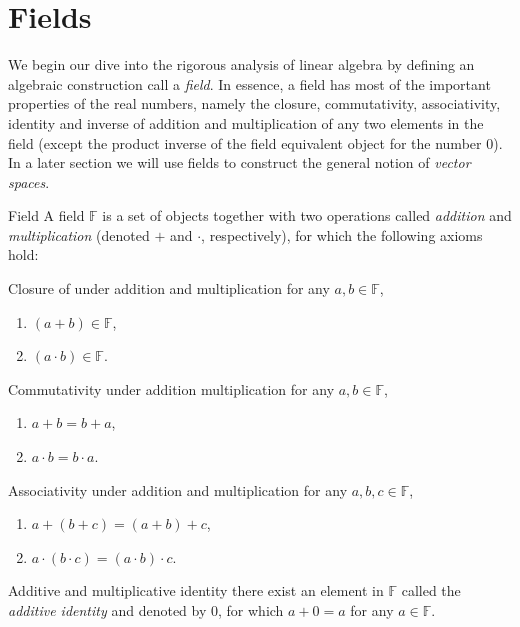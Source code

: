\section{Fields}
We begin our dive into the rigorous analysis of linear algebra by defining an algebraic construction call a \emph{field}. In essence, a field has most of the important properties of the real numbers, namely the closure, commutativity, associativity, identity and inverse of addition and multiplication of any two elements in the field (except the product inverse of the field equivalent object for the number $0$). In a later section we will use fields to construct the general notion of \emph{vector spaces}.

\begin{definition}{Field}{}
	A field $\mathbb{F}$ is a set of objects together with two operations called \emph{addition} and \emph{multiplication} (denoted $+$ and $\cdot$, respectively), for which the following axioms hold:

	\begin{descitemize}
		\item[Closure of under addition and multiplication] for any $a,b\in\mathbb{F}$,
			\begin{enumerate}
				\item $(a+b)\in\mathbb{F}$,
				\item $(a\cdot b)\in\mathbb{F}$.
			\end{enumerate}

		\item[Commutativity under addition multiplication] for any $a,b\in\mathbb{F}$,
			\begin{enumerate}
				\item $a+b=b+a$,
				\item $a\cdot b=b\cdot a$.
			\end{enumerate}

		\item[Associativity under addition and multiplication] for any $a,b,c\in\mathbb{F}$,
			\begin{enumerate}
				\item $a+(b+c)=(a+b)+c$,
				\item $a\cdot(b\cdot c)=(a\cdot b)\cdot c$.
			\end{enumerate}

		\item[Additive and multiplicative identity] there exist an element in $\mathbb{F}$ called the \textit{additive identity} and denoted by $0$, for which $a+0=a$ for any $a\in\mathbb{F}$.
			

\end{descitemize}
\end{definition}
